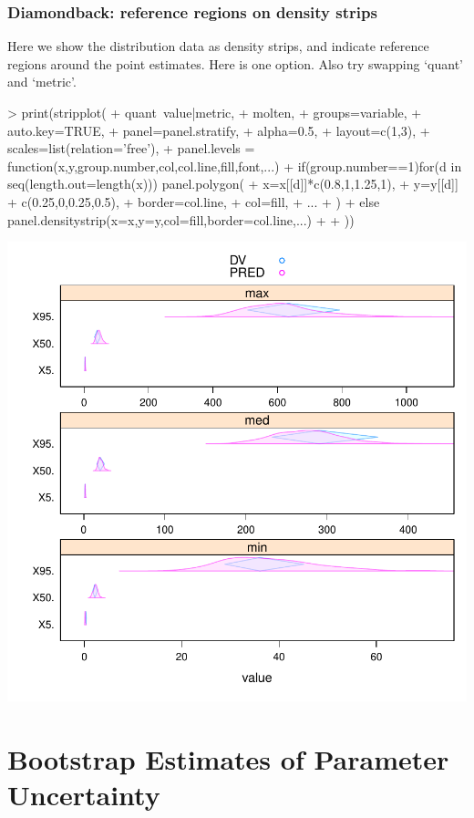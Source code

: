 \subsubsection{Diamondback: reference regions on density strips}
Here we show the distribution data as density strips, and indicate reference 
regions around the point estimates. Here is one option. Also try swapping `quant' and 
`metric'.
\begin{Schunk}
\begin{Sinput}
> print(stripplot(
+ 	quant~value|metric,
+ 	molten,
+ 	groups=variable,
+ 	auto.key=TRUE,
+ 	panel=panel.stratify,
+ 	alpha=0.5,
+ 	layout=c(1,3),
+ 	scales=list(relation='free'),
+ 	panel.levels = function(x,y,group.number,col,col.line,fill,font,...){
+ 		if(group.number==1)for(d in seq(length.out=length(x))) panel.polygon(
+ 			x=x[[d]]*c(0.8,1,1.25,1),
+ 			y=y[[d]] + c(0.25,0,0.25,0.5),
+ 			border=col.line,
+ 			col=fill,
+ 			...
+ 		)
+ 		else panel.densitystrip(x=x,y=y,col=fill,border=col.line,...)
+ 	}
+ ))
\end{Sinput}
\end{Schunk}
\includegraphics{model-diamondBack}
\section{Bootstrap Estimates of Parameter Uncertainty}
